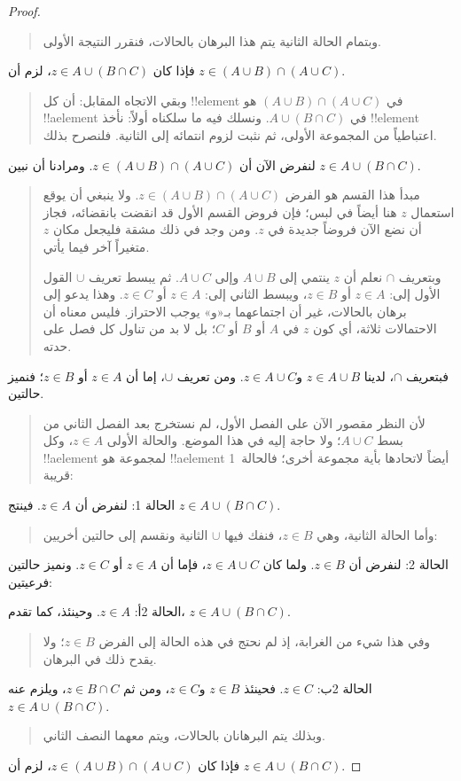 \documentclass[../../../include/open-logic-section]{subfiles}
\begin{document}
\begin{proof}
\begin{quote}
وبتمام الحالة الثانية يتم هذا البرهان بالحالات، فنقرر النتيجة الأولى.
\end{quote}
فإذا كان $z \in A \cup (B \cap C)$، لزم أن
$z \in (A \cup B) \cap (A \cup C)$.
\begin{quote}
وبقي الاتجاه المقابل: أن كل !!{element} في
$(A \cup B) \cap (A \cup C)$ هو !!a{element} في
$A \cup (B \cap C)$. ونسلك فيه ما سلكناه أولاً: نأخذ !!{element}
اعتباطياً من المجموعة الأولى، ثم نثبت لزوم انتمائه إلى الثانية.
فلنصرح بذلك.
\end{quote}
لنفرض الآن أن $z \in (A \cup B) \cap (A \cup C)$. ومرادنا أن نبين
$z \in A \cup (B \cap C)$.
\begin{quote}
مبدأ هذا القسم هو الفرض $z \in (A \cup B) \cap (A \cup C)$. ولا
ينبغي أن يوقع استعمال $z$ هنا أيضاً في لبس؛ فإن فروض القسم الأول قد
انقضت بانقضائه، فجاز أن نضع الآن فروضاً جديدة في $z$. ومن وجد في ذلك
مشقة فليجعل مكان $z$ متغيراً آخر فيما يأتي.

وبتعريف $\cap$ نعلم أن $z$ ينتمي إلى $A \cup B$ وإلى
$A \cup C$. ثم يبسط تعريف $\cup$ القول الأول إلى: $z \in A$ أو
$z \in B$، ويبسط الثاني إلى: $z \in A$ أو $z \in C$.
وهذا يدعو إلى برهان بالحالات، غير أن اجتماعهما بـ«و» يوجب الاحتراز.
فليس معناه أن الاحتمالات ثلاثة، أي كون $z$ في $A$ أو $B$ أو $C$؛ بل
لا بد من تناول كل فصل على حدته.
\end{quote}
فبتعريف $\cap$، لدينا $z \in A \cup B$ و$z \in A \cup C$. ومن
تعريف $\cup$، إما أن $z \in A$ أو $z \in B$؛ فنميز حالتين.
\begin{quote}
لأن النظر مقصور الآن على الفصل الأول، لم نستخرج بعد الفصل الثاني من
بسط $A \cup C$؛ ولا حاجة إليه في هذا الموضع. والحالة الأولى
$z \in A$، وكل !!a{element} لمجموعة هو !!a{element} أيضاً لاتحادها
بأية مجموعة أخرى؛ فالحالة~1 قريبة:
\end{quote}
الحالة 1: لنفرض أن $z \in A$. فينتج $z \in A \cup (B \cap C)$.
\begin{quote}
وأما الحالة الثانية، وهي $z \in B$، فنفك فيها $\cup$ الثانية ونقسم
إلى حالتين أخريين:
\end{quote}
الحالة 2: لنفرض أن $z \in B$. ولما كان $z \in A \cup C$، فإما أن
$z \in A$ أو $z \in C$. ونميز حالتين فرعيتين:

الحالة 2أ: $z \in A$. وحينئذ، كما تقدم،
$z \in A \cup (B \cap C)$.
\begin{quote}
وفي هذا شيء من الغرابة، إذ لم نحتج في هذه الحالة إلى الفرض
$z \in B$؛ ولا يقدح ذلك في البرهان.
\end{quote}
الحالة 2ب: $z \in C$. فحينئذ $z \in B$ و$z \in C$، ومن ثم
$z \in B \cap C$، ويلزم عنه $z \in A \cup (B \cap C)$.
\begin{quote}
وبذلك يتم البرهانان بالحالات، ويتم معهما النصف الثاني.
\end{quote}
فإذا كان $z \in (A \cup B) \cap (A \cup C)$، لزم أن
$z \in A \cup (B \cap C)$.
\end{proof}
\end{document}
